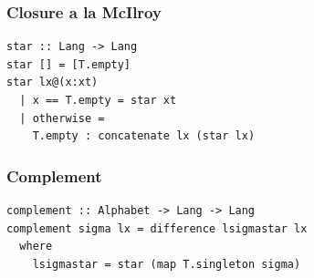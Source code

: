 \documentclass[pdftex]{beamer}
\begin{document}
\begin{frame}
  \frametitle{Closure a la McIlroy }
\begin{lstlisting}[numbers=none]
star :: Lang -> Lang
star [] = [T.empty]
star lx@(x:xt)
  | x == T.empty = star xt
  | otherwise =
    T.empty : concatenate lx (star lx)
\end{lstlisting}
\end{frame}

\begin{frame}[fragile]
  \frametitle{Complement}
\begin{lstlisting}[numbers=none]
complement :: Alphabet -> Lang -> Lang
complement sigma lx = difference lsigmastar lx
  where
    lsigmastar = star (map T.singleton sigma)
\end{lstlisting}
\end{frame}
\end{document}
